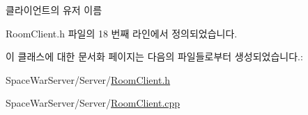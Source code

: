 클라이언트의 유저 이름 



Room\+Client.\+h 파일의 18 번째 라인에서 정의되었습니다.



이 클래스에 대한 문서화 페이지는 다음의 파일들로부터 생성되었습니다.\+:\begin{DoxyCompactItemize}
\item 
Space\+War\+Server/\+Server/\hyperlink{_room_client_8h}{Room\+Client.\+h}\item 
Space\+War\+Server/\+Server/\hyperlink{_room_client_8cpp}{Room\+Client.\+cpp}\end{DoxyCompactItemize}
